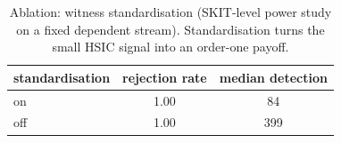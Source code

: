 \begin{table}[htbp]
\centering
\caption{Ablation: witness standardisation (SKIT-level power study on a fixed dependent stream). Standardisation turns the small HSIC signal into an order-one payoff.}
\label{tab:abl_std}
\begin{tabular}{lcc}
\hline
standardisation & rejection rate & median detection \\
\hline
on & 1.00 & 84 \\
off & 1.00 & 399 \\
\hline
\end{tabular}
\end{table}
